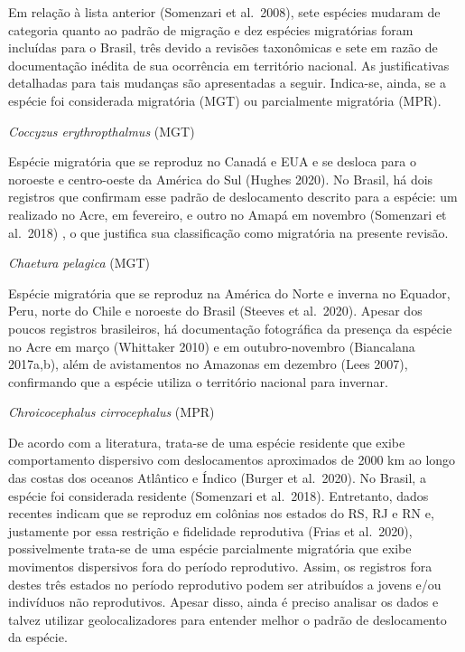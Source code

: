 \documentclass[
  oneside]{scrbook}
\begin{document}
Em relação à lista anterior (Somenzari et al.~2008), sete espécies mudaram de categoria quanto ao padrão de migração e dez espécies migratórias foram incluídas para o Brasil, três devido a revisões taxonômicas e sete em razão de documentação inédita de sua ocorrência em território nacional. As justificativas detalhadas para tais mudanças são apresentadas a seguir. Indica-se, ainda, se a espécie foi considerada migratória (MGT) ou parcialmente migratória (MPR).

\begin{blackbox}
\emph{Coccyzus erythropthalmus} (MGT)

Espécie migratória que se reproduz no Canadá e EUA e se desloca para o noroeste e centro-oeste da América do Sul (Hughes 2020). No Brasil, há dois registros que confirmam esse padrão de deslocamento descrito para a espécie: um realizado no Acre, em fevereiro, e outro no Amapá em novembro (Somenzari et al.~2018) , o que justifica sua classificação como migratória na presente revisão.

\end{blackbox}

\begin{blackbox}
\emph{Chaetura pelagica} (MGT)

Espécie migratória que se reproduz na América do Norte e inverna no Equador, Peru, norte do Chile e noroeste do Brasil (Steeves et al.~2020). Apesar dos poucos registros brasileiros, há documentação fotográfica da presença da espécie no Acre em março (Whittaker 2010) e em outubro-novembro (Biancalana 2017a,b), além de avistamentos no Amazonas em dezembro (Lees 2007), confirmando que a espécie utiliza o território nacional para invernar.

\end{blackbox}

\begin{blackbox}
\emph{Chroicocephalus cirrocephalus} (MPR)

De acordo com a literatura, trata-se de uma espécie residente que exibe comportamento dispersivo com deslocamentos aproximados de 2000 km ao longo das costas dos oceanos Atlântico e Índico (Burger et al.~2020). No Brasil, a espécie foi considerada residente (Somenzari et al.~2018). Entretanto, dados recentes indicam que se reproduz em colônias nos estados do RS, RJ e RN e, justamente por essa restrição e fidelidade reprodutiva (Frias et al.~2020), possivelmente trata-se de uma espécie parcialmente migratória que exibe movimentos dispersivos fora do período reprodutivo. Assim, os registros fora destes três estados no período reprodutivo podem ser atribuídos a jovens e/ou indivíduos não reprodutivos. Apesar disso, ainda é preciso analisar os dados e talvez utilizar geolocalizadores para entender melhor o padrão de deslocamento da espécie.

\end{blackbox}
\end{document}
